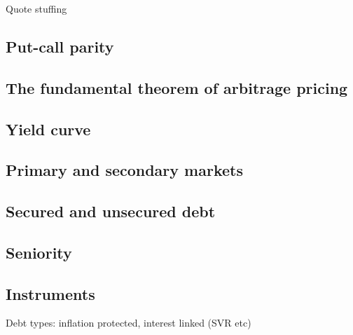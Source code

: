 Quote stuffing

\subsection{Put-call parity}

\subsection{The fundamental theorem of arbitrage pricing}

\subsection{Yield curve}


\subsection{Primary and secondary markets}


\subsection{Secured and unsecured debt}


\subsection{Seniority}


\subsection{Instruments}
Debt types: inflation protected, interest linked (SVR etc)






